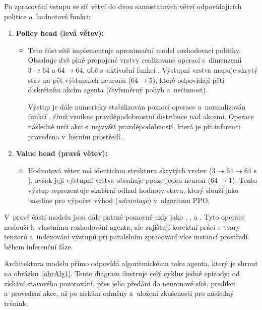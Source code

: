 Po zpracování vstupu se síť větví do dvou samostatných větví odpovídajících politice a~hodnotové funkci:

\begin{enumerate}
    \item \textbf{Policy head (levá větev):}
    \begin{itemize}
        \item Tato část sítě implementuje aproximační model rozhodovací politiky. Obsahuje dvě plně propojené vrstvy realizované operací  s~dimenzemi $3 \rightarrow 64$ a $64 \rightarrow 64$, obě s~aktivační funkcí . Výstupní vrstva mapuje skrytý stav na pět výstupních neuronů ($64 \rightarrow 5$), které odpovídají pěti diskrétním akcím agenta (čtyřsměrný pohyb a~nečinnost).
        
        Výstup je dále numericky stabilizován pomocí operace  a~normalizován funkcí , čímž vznikne pravděpodobnostní distribuce nad akcemi. Operace  následně určí akci s~nejvyšší pravděpodobností, která je při inferenci provedena v~herním prostředí.
    \end{itemize}

    \item \textbf{Value head (pravá větev):}
    \begin{itemize}
        \item Hodnotová větev má identickou strukturu skrytých vrstev ($3 \rightarrow 64 \rightarrow 64$ s ), avšak její výstupní vrstva obsahuje pouze jeden neuron ($64 \rightarrow 1$). Tento výstup reprezentuje skalární odhad hodnoty stavu, který slouží jako baseline pro výpočet výhod (\emph{advantage}) v~algoritmu PPO.
    \end{itemize}
\end{enumerate}

V~pravé části modelu jsou dále patrné pomocné uzly jako , ,  a . Tyto operace neslouží k~vlastnímu rozhodování agenta, ale zajišťují korektní práci s~tvary tenzorů a~indexování výstupů při paralelním zpracování více instancí prostředí během inferenční fáze.

Architektura modelu přímo odpovídá algoritmickému toku agenta, který je shrnut na obrázku~\ref{obrAlg1}. Tento diagram ilustruje celý cyklus jedné epizody: od získání stavového pozorování, přes jeho předání do neuronové sítě, predikci a~provedení akce, až po získání odměny a~uložení zkušenosti pro následný trénink.

